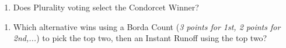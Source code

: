 \documentclass[11pt]{article}
\begin{document}
\begin{enumerate}[label=\alph*), start=2]
\item  Does Plurality voting select the Condorcet Winner? \hfill \raisebox{-1ex}{\rule{4.2cm}{1pt}}

\end{enumerate}
\vspace{1cm}

\begin{enumerate}[label=\alph*), start=3]
\item  Which alternative wins using a Borda Count (\textit{3 points for 1st, 2 points for 2nd,...}) to pick the top two, then an Instant Runoff using the top two? \hfill \raisebox{-1ex}{\rule{4.2cm}{1pt}}

\end{enumerate}
\end{document}
